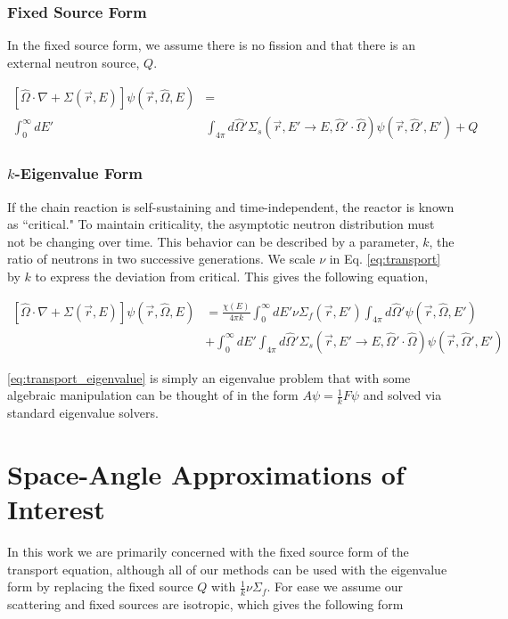 \subsubsection{Fixed Source Form}
In the fixed source form, we assume there is no fission and that there is an external neutron source, $Q$.

\begin{equation}
\begin{split}
 [\hat{\Omega} \cdot \nabla + \Sigma(\vec{r}, E)]\psi(\vec{r}, \hat{\Omega}, E) &= \\ \int_0^\infty dE' &\int_{4\pi} d\hat{\Omega}' \Sigma_s(\vec{r}, E' \rightarrow E, \hat{\Omega}' \cdot \hat{\Omega})\psi(\vec{r}, \hat{\Omega}', E')  +Q 
\end{split}
 \label{eq:transport_fixed_source}
\end{equation}

\subsubsection{$k$-Eigenvalue Form}
If the chain reaction is self-sustaining and time-independent, the reactor is known as ``critical." To maintain criticality, the asymptotic neutron distribution must not be changing over time. This behavior can be described by a parameter,  $k$, the ratio of neutrons in two successive generations. We scale $\nu$ in Eq. \eqref{eq:transport} by $k$ to express the deviation from critical. This gives the following equation,

\begin{equation}
    \label{eq:transport_eigenvalue}
    \begin{split}
        [\hat{\Omega} \cdot \nabla + \Sigma(\vec{r}, E)]\psi(\vec{r}, \hat{\Omega}, E) &= \frac{\chi(E)}{4\pi k} \int_0^\infty dE' \nu \Sigma_{f}(\vec{r}, E') \int_{4\pi} d\hat{\Omega}'\psi(\vec{r}, \hat{\Omega}, E') \\ &+ \int_0^\infty dE' \int_{4\pi} d\hat{\Omega}' \Sigma_s(\vec{r}, E' \rightarrow E, \hat{\Omega}' \cdot \hat{\Omega})\psi(\vec{r}, \hat{\Omega}', E') 
    \end{split}
\end{equation}

\eqref{eq:transport_eigenvalue} is simply an eigenvalue problem that with some algebraic manipulation can be thought of in the form $A\psi = \frac{1}{k} F\psi$ and solved via standard eigenvalue solvers. 

\section{Space-Angle Approximations of Interest}
In this work we are primarily concerned with the fixed source form of the transport equation, although all of our methods can be used with the eigenvalue form by replacing the fixed source $Q$ with $\frac{1}{k}\nu\Sigma_f$. For ease we assume our scattering and fixed sources are isotropic, which gives the following form

